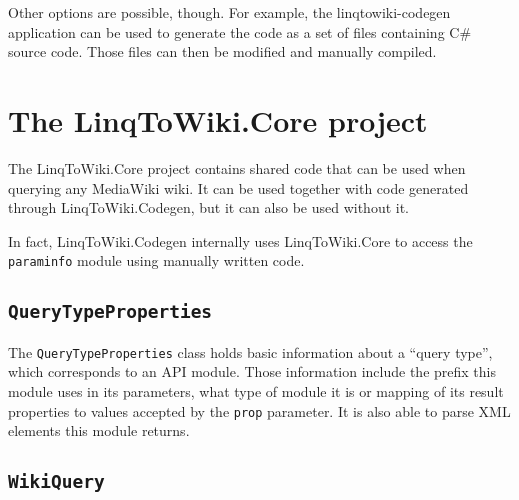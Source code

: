 Other options are possible, though.
For example, the linqtowiki-codegen application can be used to generate the code as a set of files containing C\# source code.
Those files can then be modified and manually compiled.

\section{The LinqToWiki.Core project}

The LinqToWiki.Core project contains shared code that can be used when querying any MediaWiki wiki.
It can be used together with code generated through LinqToWiki\allowbreak{}.Codegen,
but it can also be used without it.

In fact, LinqToWiki.\allowbreak{}Codegen internally uses LinqToWiki.Core to access the \texttt{paraminfo} module
using manually written code.

\subsection{\lstinline{QueryTypeProperties}}

The \lstinline{QueryTypeProperties} class holds basic information about a “query type”,
which corresponds to an API module.
Those information include the prefix this module uses in its parameters,
what type of module it is or mapping of its result properties to values accepted by the \texttt{prop} parameter.
It is also able to parse XML elements this module returns.

\subsection{\lstinline{WikiQuery}}

